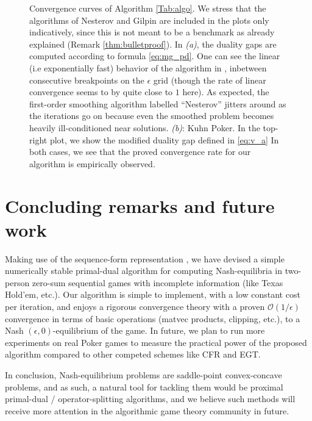 \documentclass[a4paper,9pt]{extarticle}
\begin{document}
\begin{figure}[!htpb]
  \caption{Convergence curves of Algorithm
    \ref{Tab:algo}.  We stress that the algorithms of Nesterov
    \cite{nesterov2005a} and Gilpin \cite{gilpinfirst} are included in
    the plots only indicatively, since this is not meant to be a
    benchmark as already explained (Remark \ref{thm:bulletproof}). In
    \textit{(a)}, the duality gaps
    are computed according to formula \eqref{eq:mg_pd}. One can see
    the linear (i.e exponentially fast) behavior of the algorithm in
    \cite{gilpinfirst}, inbetween consecutive breakpoints on the
    $\epsilon$ grid (though the rate of linear convergence seems
    to by quite close to $1$ here). As expected, the first-order smoothing
    algorithm labelled ``Nesterov'' \cite{nesterov2005a} jitters
    around as the iterations go on because even the smoothed problem
    becomes heavily ill-conditioned
    near solutions. %
  \textit{(b)}: Kuhn Poker. In the top-right plot, we show the
  modified duality gap defined in \eqref{eq:v_a} In both cases, we see
  that the proved convergence rate for our algorithm is empirically
  observed.}
  \label{Tab:dgap_curve}
\end{figure}

\section{Concluding remarks and future work}
Making use of the sequence-form representation
\cite{koller1992complexity,von1996efficient,vonequilibrium}, we have
devised a simple numerically stable primal-dual algorithm for computing
Nash-equilibria in two-person zero-sum sequential games with
incomplete information (like Texas Hold'em, etc.). Our algorithm is
simple to implement, with a low constant cost per iteration, and
enjoys a rigorous convergence theory with a proven
$\mathcal{O}(1/\epsilon)$ convergence in terms of basic operations
(matvec products, clipping, etc.), to a Nash
$(\epsilon,0)$-equilibrium of the game. In future, we plan to run more
experiments on real Poker games to measure the practical power of the
proposed algorithm compared to other competed schemes like CFR and
EGT.

In conclusion, Nash-equilibrium problems are saddle-point
convex-concave problems, and as such, a natural tool
for tackling them would be proximal primal-dual / operator-splitting
algorithms, and we believe such methods will receive more attention
in the algorithmic game theory community in future.
\end{document}
